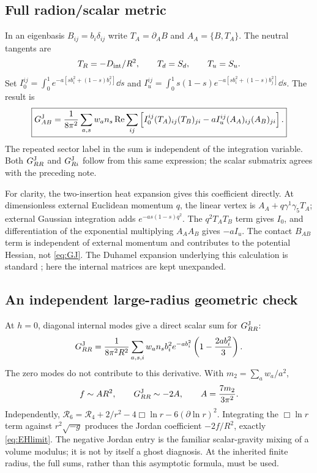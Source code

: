 \subsection{Full radion/scalar metric}

In an eigenbasis $B_{ij}=b_i\delta_{ij}$ write $T_A=\partial_A B$ and $A_A=\{B,T_A\}$. The neutral tangents are
\begin{equation}
 T_R=-D_{\rm int}/R^2,\qquad T_d=S_d,\qquad T_u=S_u.
\end{equation}
Set $I_0^{ij}=\int_0^1e^{-a[sb_i^2+(1-s)b_j^2]}\dd s$ and
$I_u^{ij}=\int_0^1s(1-s)e^{-a[sb_i^2+(1-s)b_j^2]}\dd s$. The result is
\begin{equation}
 \boxed{\displaystyle
 G^{\mathrm J}_{AB}=\frac1{8\pi^2}\sum_{a,s}w_an_s\operatorname{Re}\sum_{ij}
 \left[I_0^{ij}(T_A)_{ij}(T_B)_{ji}
      -aI_u^{ij}(A_A)_{ij}(A_B)_{ji}\right].}
 \label{eq:GJ}
\end{equation}
The repeated sector label in the sum is independent of the integration variable. Both $G^{\mathrm J}_{RR}$ and $G^{\mathrm J}_{Ri}$ follow from this same expression; the scalar submatrix agrees with the preceding note.

For clarity, the two-insertion heat expansion gives this coefficient directly. At dimensionless external Euclidean momentum $q$, the linear vertex is $A_A+q\gamma^1\gamma_5T_A$; external Gaussian integration adds $e^{-as(1-s)q^2}$. The $q^2T_AT_B$ term gives $I_0$, and differentiation of the exponential multiplying $A_AA_B$ gives $-aI_u$. The contact $B_{AB}$ term is independent of external momentum and contributes to the potential Hessian, not \eqref{eq:GJ}. The Duhamel expansion underlying this calculation is standard \cite{spectral}; here the internal matrices are kept unexpanded.

\subsection{An independent large-radius geometric check}

At $h=0$, diagonal internal modes give a direct scalar sum for $G^{\mathrm J}_{RR}$:
\begin{equation}
 G^{\mathrm J}_{RR}=\frac1{8\pi^2R^2}\sum_{a,s,i}w_an_s b_i^2e^{-ab_i^2}
                       \left(1-\frac{2a b_i^2}{3}\right).
\end{equation}
The zero modes do not contribute to this derivative. With $m_2=\sum_aw_a/a^2$,
\begin{equation}
 f\sim A R^2,\qquad G^{\mathrm J}_{RR}\sim-2A,\qquad A=\frac{7m_2}{3\pi^2}.
 \label{eq:EHlimit}
\end{equation}
Independently, $\mathcal R_6=\mathcal R_4+2/r^2-4\Box\ln r-6(\partial\ln r)^2$.
Integrating the $\Box\ln r$ term against $r^2\sqrt{-g}$ produces the Jordan coefficient $-2f/R^2$, exactly \eqref{eq:EHlimit}. The negative Jordan entry is the familiar scalar-gravity mixing of a volume modulus; it is not by itself a ghost diagnosis. At the inherited finite radius, the full sums, rather than this asymptotic formula, must be used.

